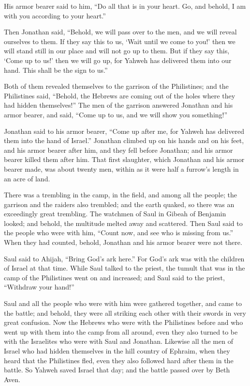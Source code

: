  His armor bearer said to him, ``Do all that is in your
heart. Go, and behold, I am with you according to your heart.''

 Then Jonathan said, ``Behold, we will pass over to the
men, and we will reveal ourselves to them.  If they say
this to us, `Wait until we come to you!' then we will stand still in our
place and will not go up to them.  But if they say this,
`Come up to us!' then we will go up, for Yahweh has delivered them into
our hand. This shall be the sign to us.''

 Both of them revealed themselves to the garrison of the
Philistines; and the Philistines said, ``Behold, the Hebrews are coming
out of the holes where they had hidden themselves!''  The
men of the garrison answered Jonathan and his armor bearer, and said,
``Come up to us, and we will show you something!''

Jonathan said to his armor bearer, ``Come up after me, for Yahweh has
delivered them into the hand of Israel.''  Jonathan
climbed up on his hands and on his feet, and his armor bearer after him,
and they fell before Jonathan; and his armor bearer killed them after
him.  That first slaughter, which Jonathan and his armor
bearer made, was about twenty men, within as it were half a furrow's
length in an acre of land.

 There was a trembling in the camp, in the field, and
among all the people; the garrison and the raiders also trembled; and
the earth quaked, so there was an exceedingly great trembling.
 The watchmen of Saul in Gibeah of Benjamin looked; and
behold, the multitude melted away and scattered.  Then
Saul said to the people who were with him, ``Count now, and see who is
missing from us.'' When they had counted, behold, Jonathan and his armor
bearer were not there.

 Saul said to Ahijah, ``Bring God's ark here.'' For God's
ark was with the children of Israel at that time.  While
Saul talked to the priest, the tumult that was in the camp of the
Philistines went on and increased; and Saul said to the priest,
``Withdraw your hand!''

 Saul and all the people who were with him were gathered
together, and came to the battle; and behold, they were all striking
each other with their swords in very great confusion. 
Now the Hebrews who were with the Philistines before and who went up
with them into the camp from all around, even they also turned to be
with the Israelites who were with Saul and Jonathan. 
Likewise all the men of Israel who had hidden themselves in the hill
country of Ephraim, when they heard that the Philistines fled, even they
also followed hard after them in the battle.  So Yahweh
saved Israel that day; and the battle passed over by Beth Aven.

